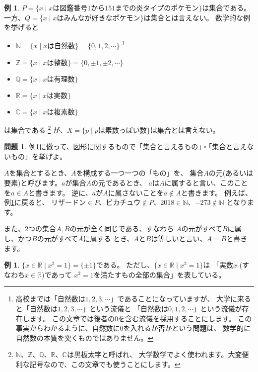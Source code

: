 \documentclass[./main]{subfiles} %
\theoremstyle{definition}
\newtheorem{ex}[defi]{例}
\newtheorem{qst}[defi]{問題}
\begin{document}
\begin{ex}
\label{shugo}
$P=\{x\mid xは図鑑番号1から151までの炎タイプのポケモン\}$は集合である。
一方、$Q=\{x\mid xはみんなが好きなポケモン\}$は集合とは言えない。
数学的な例を挙げると
\begin{itemize}
\item $\mathbb{N}=\{x\mid xは自然数\}=\{0,1,2,\cdots\}$
\footnote{高校までは「自然数は$1,2,3,\cdots$」であることになっていますが、
大学に来ると「自然数は$1,2,3,\cdots$」という流儀と
「自然数は$0,1,2,\cdots$」という流儀が存在します。
この文章では後者の0を含む流儀を採用することにします。
この事実からわかるように、自然数に0を入れるか否かという問題は、
数学的に自然数の本質を突くものではありません。}
\item $\mathbb{Z}=\{x\mid xは整数\}=\{0,\pm1,\pm2,\cdots\}$
\item $\mathbb{Q}=\{x\mid xは有理数\}$
\item $\mathbb{R}=\{x\mid xは実数\}$
\item $\mathbb{C}=\{x\mid xは複素数\}$
\end{itemize}
は集合である
\footnote{$\mathbb{N}$、$\mathbb{Z}$、$\mathbb{Q}$、$\mathbb{R}$、$\mathbb{C}$は黒板太字と呼ばれ、
大学数学でよく使われます。大変便利な記号なので、この文章でも使うことにします。}
が、$X=\{p\mid pは素数っぽい数\}$は集合とは言えない。
\end{ex}

\begin{qst}
\label{shugoq}
例\ref{shugo}に倣って、図形に関するもので「集合と言えるもの」・「集合と言えないもの」を挙げよ。
\end{qst}

$A$を集合とするとき、$A$を構成する一つ一つの「もの」を、
集合$A$の元(あるいは要素)と呼びます。$a$が集合$A$の元であるとき、
$a$は$A$に属すると言い、このことを$a\in A$と書きます。
逆に、$a$が$A$に属さないことを$a\notin A$と書きます。
例えば、例\ref{shugo}に戻ると、
$リザードン\in P$、$ピカチュウ\notin P$、$2018\in\mathbb{N}$、$-273\notin\mathbb{N}$
となります。

また、2つの集合$A,B$の元が全く同じである、すなわち
$A$の元がすべて$B$に属し、かつ$B$の元がすべて$A$に属する
とき、$A$と$B$は等しいと言い、$A=B$と書きます。

\begin{ex}
$\{x\in\mathbb{R}\mid x^2=1\}=\{\pm1\}$である。
ただし、$\{x\in\mathbb{R}\mid x^2=1\}$は
「実数$x$ (すなわち$x\in\mathbb{R}$)であって
$x^2=1$を満たすもの全部の集合」を表している。
\end{ex}
\end{document}
